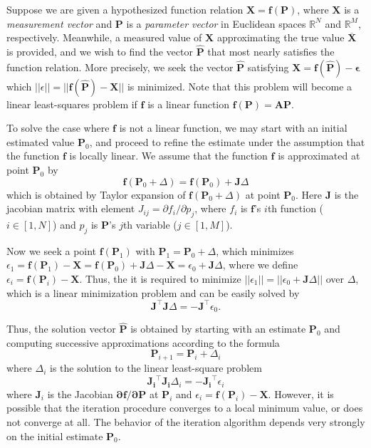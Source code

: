 \documentclass[12pt]{article}
\numberwithin{equation}{section}
\begin{document}
Suppose we are given a hypothesized function relation $\mathbf{X = f(P)}$, where $\mathbf{X}$ is a \textit{measurement vector} and $\mathbf{P}$ is a \textit{parameter vector} in Euclidean spaces $\mathbb{R}^N$ and $\mathbb{R}^M$, respectively. Meanwhile, a measured value of $\mathbf{X}$ approximating the true value $\mathbf{\overline{X}}$ is provided, and we wish to find the vector $\mathbf{\hat{P}}$ that most nearly satisfies the function relation. More precisely, we seek the vector $\mathbf{\hat{P}}$ satisfying $\mathbf{X = f(\hat{P}) - \epsilon}$ which $||\epsilon|| = ||\mathbf{f(\hat{P}) - X}||$ is minimized. Note that this problem will become a linear least-squares problem if $\mathbf{f}$ is a linear function $\mathbf{f(P) = AP}$.

To solve the case where $\mathbf{f}$ is not a linear function, we may start with an initial estimated value $\mathbf{P}_0$, and proceed to refine the estimate under the assumption that the function $\mathbf{f}$ is locally linear. We assume that the function $\mathbf{f}$ is approximated at point $\mathbf{P}_0$ by
\begin{equation*}
\mathbf{f}(\mathbf{P}_0 + \Delta) = \mathbf{f}(\mathbf{P}_0) + \mathbf{J}\Delta
\end{equation*}
which is obtained by Taylor expansion of $\mathbf{f}(\mathbf{P}_0 + \Delta)$ at point $\mathbf{P}_0$. Here $\mathbf{J}$ is the jacobian matrix with element $J_{ij} = \partial f_i / \partial p_j$, where $f_i$ is $\mathbf{f}$'s $i$th function ($ i \in [1,N]$) and $p_j$ is $\mathbf{P}$'s $j$th variable ($j \in [1,M]$).

Now we seek a point $\mathbf{f}(\mathbf{P}_1)$ with $\mathbf{P}_1 = \mathbf{P}_0 + \Delta$, which minimizes $\epsilon_1 = \mathbf{f}(\mathbf{P}_1) - \mathbf{X} = \mathbf{f}(\mathbf{P}_0) + \mathbf{J}\Delta - \mathbf{X} = \epsilon_0 + \mathbf{J}\Delta$, where we define $\epsilon_i = \mathbf{f}(\mathbf{P}_i) - \mathbf{X}$. Thus, the it is required to minimize $||\epsilon_1|| = ||\epsilon_0 + \mathbf{J}\Delta||$ over $\Delta$, which is a linear minimization problem and can be easily solved by
\begin{equation*}
\mathbf{J}^\top\mathbf{J}\Delta = -\mathbf{J}^\top \epsilon_0.
\end{equation*}

Thus, the solution vector $\mathbf{\hat{P}}$ is obtained by starting with an estimate $\mathbf{P}_0$ and computing successive approximations according to the formula
%
\begin{equation*}
\mathbf{P}_{i+1} = \mathbf{P}_i + \Delta_i
\end{equation*}
where $\Delta_i$ is the solution to the linear least-square problem
%
\begin{equation}
\mathbf{J_i}^\top\mathbf{J_i}\Delta_i = -\mathbf{J_i}^\top \epsilon_i
\label{eq:nonlinear:gaussnewton}
\end{equation}
%
where $\mathbf{J}_i$ is the Jacobian $\mathbf{\partial f / \partial P}$ at $\mathbf{P}_i$ and $\epsilon_i = \mathbf{f}(\mathbf{P}_i) - \mathbf{X}$. However, it is possible that the iteration procedure converges to a local minimum value, or does not converge at all. The behavior of the iteration algorithm depends very strongly on the initial estimate $\mathbf{P}_0$.
\end{document}
